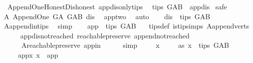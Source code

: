 \begin{isabellebody}
\isamarkupfalse%
\ {\isacharparenleft}{\kern0pt}\ Append{\isacharunderscore}{\kern0pt}One{\isacharunderscore}{\kern0pt}Honest{\isacharunderscore}{\kern0pt}Dishonest{\isacharparenright}{\kern0pt}\ app{\isacharunderscore}{\kern0pt}dis{\isacharunderscore}{\kern0pt}only{\isacharunderscore}{\kern0pt}tips{\isacharcolon}{\kern0pt}\isanewline
\ \ {\isachardoublequoteopen}tips\ G{\isacharunderscore}{\kern0pt}AB\ {\isacharequal}{\kern0pt}\ {\isacharbraceleft}{\kern0pt}app{\isacharcomma}{\kern0pt}dis{\isacharbraceright}{\kern0pt}{\isachardoublequoteclose}\isanewline
%
\isadelimproof
%
\endisadelimproof
%
\isatagproof
{}\isamarkupfalse%
\ safe\isanewline
\ \ \isamarkupfalse%
\ A{}{\isacharcolon}{\kern0pt}\ Append{\isacharunderscore}{\kern0pt}One\ G{\isacharunderscore}{\kern0pt}A\ G{\isacharunderscore}{\kern0pt}AB\ dis\ \isamarkupfalse%
\ app{\isacharunderscore}{\kern0pt}two\ \isamarkupfalse%
\ auto\isanewline
\ \ \isamarkupfalse%
\ {\isachardoublequoteopen}dis\ {\isasymin}\ tips\ G{\isacharunderscore}{\kern0pt}AB\ {\isachardoublequoteclose}\ \isamarkupfalse%
\ A{}{\isachardot}{\kern0pt}append{\isacharunderscore}{\kern0pt}in{\isacharunderscore}{\kern0pt}tips\ \isamarkupfalse%
\ simp\isanewline
\ \ \isamarkupfalse%
\ {\isachardoublequoteopen}app\ {\isasymin}\ tips\ G{\isacharunderscore}{\kern0pt}AB\ {\isachardoublequoteclose}\ \isamarkupfalse%
\ tips{\isacharunderscore}{\kern0pt}def\ is{\isacharunderscore}{\kern0pt}tip{\isachardot}{\kern0pt}simps\ A{}{\isachardot}{\kern0pt}append{\isacharunderscore}{\kern0pt}verts\isanewline
\ \ \ \ \isamarkupfalse%
\ app{\isacharunderscore}{\kern0pt}dis{\isacharunderscore}{\kern0pt}not{\isacharunderscore}{\kern0pt}reached\ reachable{}{\isacharunderscore}{\kern0pt}preserve\ append{\isacharunderscore}{\kern0pt}not{\isacharunderscore}{\kern0pt}reached\isanewline
\ \ \ \ \ \ A{}{\isachardot}{\kern0pt}reachable{}{\isacharunderscore}{\kern0pt}preserve\ app{\isacharunderscore}{\kern0pt}in\isanewline
\ \ \ \ \isamarkupfalse%
\ simp\ \isanewline
\ \ \isamarkupfalse%
\ x\ \isanewline
\ \ \isamarkupfalse%
\ as{}{\isacharcolon}{\kern0pt}\ {\isachardoublequoteopen}x\ {\isasymin}\ tips\ G{\isacharunderscore}{\kern0pt}AB{\isachardoublequoteclose}\isanewline
\ \ \ \ \ app{\isacharunderscore}{\kern0pt}x{\isacharcolon}{\kern0pt}\ {\isachardoublequoteopen}x\ {\isasymnoteq}\ app{\isachardoublequoteclose}\isanewline

\end{isabellebody}
